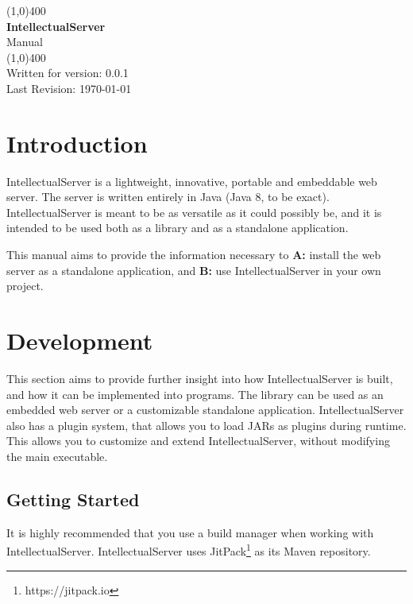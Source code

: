 \documentclass[12pt]{article}
\newcommand{\version}{0.0.1}
\begin{document}
\begin{titlepage}
\linespread{1}
\begin{center}
	\vspace*{1cm}
	\line(1,0){400}\\
	\vspace*{0.5cm}
	\Large\textbf{IntellectualServer} \\
	\Large{Manual} \\
	\line(1,0){400}\\
	\vfill
	Written for version: \version \\
	Last Revision: \today
	\vfill
\end{center}
\end{titlepage}
\clearpage

\tableofcontents
\clearpage

\section{Introduction}
IntellectualServer is a lightweight, innovative, portable and embeddable web server. The server is written entirely in Java (Java 8, to be exact). IntellectualServer is meant to be as versatile as it could possibly be, and it is intended to be used both as a library and as a standalone application. 

This manual aims to provide the information necessary to \textbf{A:} install the web server as a standalone application, and \textbf{B:} use IntellectualServer in your own project.

\newpage

\section{Development}
This section aims to provide further insight into how IntellectualServer is built, and how it can be implemented into programs. The library can be used as an embedded web server or a customizable standalone application. IntellectualServer also has a plugin system, that allows you to load JARs as plugins during runtime. This allows you to customize and extend IntellectualServer, without modifying the main executable. 

\subsection{Getting Started}
It is highly recommended that you use a build manager when working with IntellectualServer. IntellectualServer uses JitPack\footnote{https://jitpack.io} as its Maven repository. 
\end{document}
